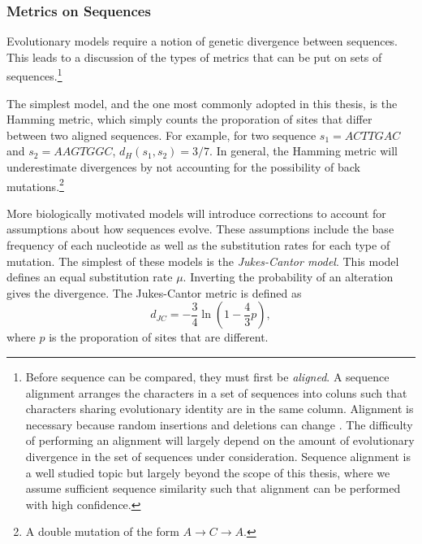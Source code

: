 
\subsubsection{Metrics on Sequences}
\label{bg:bio:models:metrics}

Evolutionary models require a notion of genetic divergence between sequences.
This leads to a discussion of the types of metrics that can be put on sets of sequences.\footnote{Before sequence can be compared, they must first be \emph{aligned}. A sequence alignment arranges the characters in a set of sequences into coluns such that characters sharing evolutionary identity are in the same column. Alignment is necessary because random insertions and deletions can change . The difficulty of performing an alignment will largely depend on the amount of evolutionary divergence in the set of sequences under consideration. Sequence alignment is a well studied topic but largely beyond the scope of this thesis, where we assume sufficient sequence similarity such that alignment can be performed with high confidence.}

The simplest model, and the one most commonly adopted in this thesis, is the Hamming metric, which simply counts the proporation of sites that differ between two aligned sequences.
For example, for two sequence $s_1=ACTTGAC$ and $s_2=AAGTGGC$, $d_{H}(s_1,s_2)=3/7$.
In general, the Hamming metric will underestimate divergences by not accounting for the possibility of back mutations.\footnote{A double mutation of the form $A\rightarrow C\rightarrow A$.}

More biologically motivated models will introduce corrections to account for assumptions about how sequences evolve.
These assumptions include the base frequency of each nucleotide as well as the substitution rates for each type of mutation.
The simplest of these models is the \emph{Jukes-Cantor model}.
This model defines an equal substitution rate $\mu$.
Inverting the probability of an alteration gives the divergence.
The Jukes-Cantor metric is defined as 
\begin{equation}
d_{JC}=-\frac{3}{4}\ln(1-\frac{4}{3}p),
\end{equation}
where $p$ is the proporation of sites that are different.

